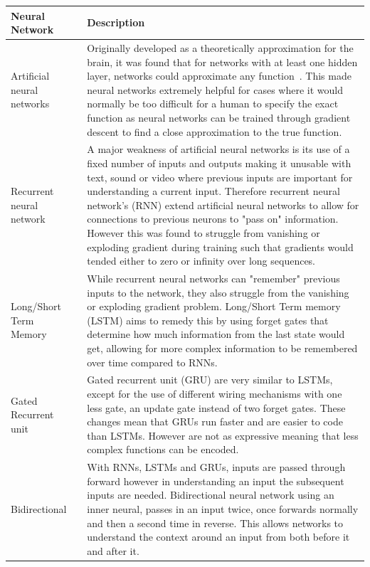 \begin{longtable}{|p{3.5cm}|p{10cm}|} \hline
    \textbf{Neural Network} & \textbf{Description} \\ \hline
    Artificial neural networks~\citep{ANN} & Originally developed as a theoretically approximation for the brain, it
        was found that for networks with at least one hidden layer, networks could approximate any
        function~\citep{csaji2001approximation}. This made neural networks extremely helpful for cases where it would
        normally be too difficult for a human to specify the exact function as neural networks can be trained through
        gradient descent to find a close approximation to the true function. \\ \hline

    Recurrent neural network~\citep{RNN} & A major weakness of artificial neural networks is its use of a fixed
        number of inputs and outputs making it unusable with text, sound or video where previous inputs are important
        for understanding a current input. Therefore recurrent neural network's (RNN) extend artificial neural networks
        to allow for connections to previous neurons to "pass on" information. However this was found to struggle from
        vanishing or exploding gradient during training such that gradients would tended either to zero or infinity
        over long sequences. \\ \hline

    Long/Short Term Memory~\citep{LSTM} & While recurrent neural networks can "remember" previous inputs to the
        network, they also struggle from the vanishing or exploding gradient problem. Long/Short Term memory (LSTM) aims
        to remedy this by using forget gates that determine how much information from the last state would get, allowing
        for more complex information to be remembered over time compared to RNNs. \\ \hline

    Gated Recurrent unit~\citep{GRU} & Gated recurrent unit (GRU) are very similar to LSTMs, except for the use of
        different wiring mechanisms with one less gate, an update gate instead of two forget gates. These changes mean
        that GRUs run faster and are easier to code than LSTMs. However are not as expressive meaning that less complex
        functions can be encoded. \\ \hline

    Bidirectional~\citep{Bidirectional} & With RNNs, LSTMs and GRUs, inputs are passed through forward however in
        understanding an input the subsequent inputs are needed. Bidirectional neural network using an inner neural,
        passes in an input twice, once forwards normally and then a second time in reverse. This allows networks to
        understand the context around an input from both before it and after it. \\ \hline


\end{longtable}
